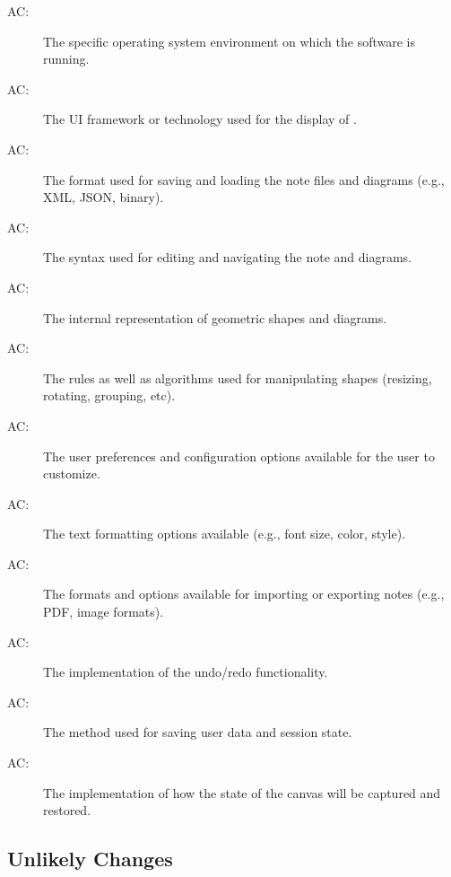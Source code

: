 \documentclass[12pt, titlepage]{article}
\newcounter{acnum}
\newcommand{\actheacnum}{AC\theacnum}
\begin{document}
\begin{description}
\item[ \actheacnum \label{acOS}:] The specific operating
  system environment on which the software is running.
\item[ \actheacnum \label{acFramwork}:] The UI framework
  or technology used for the display of \progname{}.
\item[ \actheacnum \label{acFileFormat}:] The format used for
  saving and loading the note files and diagrams (e.g., XML, JSON, binary).
\item [ \actheacnum \label{acSyntax}:] The syntax used for
  editing and navigating the note and diagrams.
\item [ \actheacnum \label{acGeometry}:] The internal
  representation of geometric shapes and diagrams.
\item [ \actheacnum \label{acShapeManipulation}:] The
  rules as well as algorithms used for manipulating shapes (resizing, rotating,
  grouping, etc).
\item [ \actheacnum \label{acPreferences}:] The user
  preferences and configuration options available for the user to customize.
\item [ \actheacnum \label{acTextFormatting}:] The text
  formatting options available (e.g., font size, color, style).
\item [ \actheacnum \label{acImportExport}:] The formats
  and options available for importing or exporting notes (e.g., PDF, image formats).
\item [ \actheacnum \label{acUndoRedo}:] The implementation
  of the undo/redo functionality.
\item [ \actheacnum \label{acPersistence}:] The method used
  for saving user data and session state.
\item [ \actheacnum \label{acCanvasState}:] The implementation
  of how the state of the canvas will be captured and restored.
\end{description}


\subsection{Unlikely Changes} \label{SecUchange}
\end{document}
